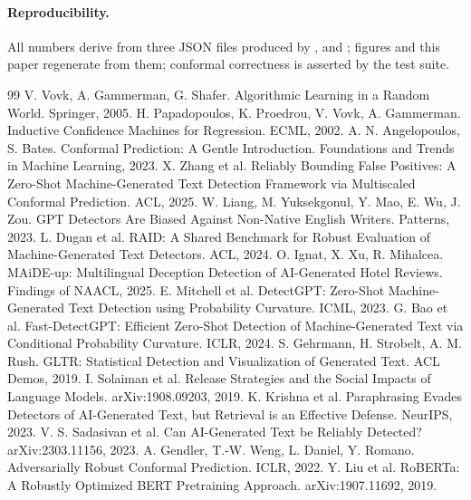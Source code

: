 \documentclass[11pt]{article}
\begin{document}
\paragraph{Reproducibility.} All numbers derive from three JSON files produced by ,  and ; figures and this paper regenerate from them; conformal correctness is asserted by the test suite.
\begin{thebibliography}{99}\small
{} V. Vovk, A. Gammerman, G. Shafer. Algorithmic Learning in a Random World. Springer, 2005.
 H. Papadopoulos, K. Proedrou, V. Vovk, A. Gammerman. Inductive Confidence Machines for Regression. ECML, 2002.
 A. N. Angelopoulos, S. Bates. Conformal Prediction: A Gentle Introduction. Foundations and Trends in Machine Learning, 2023.
 X. Zhang et al. Reliably Bounding False Positives: A Zero-Shot Machine-Generated Text Detection Framework via Multiscaled Conformal Prediction. ACL, 2025.
 W. Liang, M. Yuksekgonul, Y. Mao, E. Wu, J. Zou. GPT Detectors Are Biased Against Non-Native English Writers. Patterns, 2023.
 L. Dugan et al. RAID: A Shared Benchmark for Robust Evaluation of Machine-Generated Text Detectors. ACL, 2024.
 O. Ignat, X. Xu, R. Mihalcea. MAiDE-up: Multilingual Deception Detection of AI-Generated Hotel Reviews. Findings of NAACL, 2025.
 E. Mitchell et al. DetectGPT: Zero-Shot Machine-Generated Text Detection using Probability Curvature. ICML, 2023.
 G. Bao et al. Fast-DetectGPT: Efficient Zero-Shot Detection of Machine-Generated Text via Conditional Probability Curvature. ICLR, 2024.
 S. Gehrmann, H. Strobelt, A. M. Rush. GLTR: Statistical Detection and Visualization of Generated Text. ACL Demos, 2019.
 I. Solaiman et al. Release Strategies and the Social Impacts of Language Models. arXiv:1908.09203, 2019.
 K. Krishna et al. Paraphrasing Evades Detectors of AI-Generated Text, but Retrieval is an Effective Defense. NeurIPS, 2023.
 V. S. Sadasivan et al. Can AI-Generated Text be Reliably Detected? arXiv:2303.11156, 2023.
 A. Gendler, T.-W. Weng, L. Daniel, Y. Romano. Adversarially Robust Conformal Prediction. ICLR, 2022.
 Y. Liu et al. RoBERTa: A Robustly Optimized BERT Pretraining Approach. arXiv:1907.11692, 2019.
\end{thebibliography}
\end{document}
